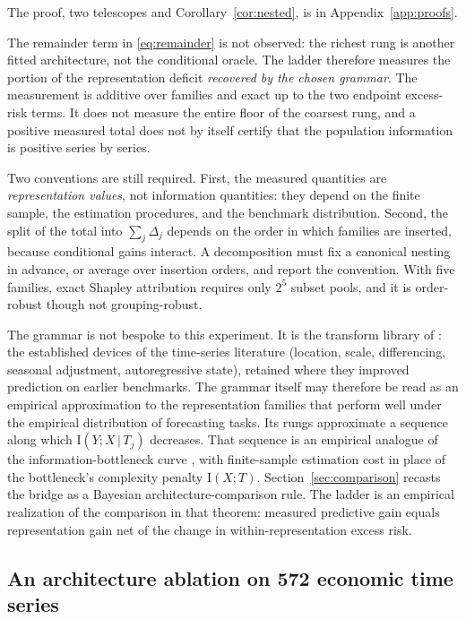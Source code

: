 \documentclass[11pt]{article}
\theoremstyle{remark}
\newcommand{\I}{\mathrm{I}}
\newcommand{\given}{\,|\,}
\begin{document}
The proof, two telescopes and Corollary~\ref{cor:nested}, is in Appendix~\ref{app:proofs}.

The remainder term in \eqref{eq:remainder} is not observed: the richest rung is another fitted
architecture, not the conditional oracle. The ladder therefore measures the portion of the
representation deficit \emph{recovered by the chosen grammar}. The measurement is additive
over families and exact up to the two endpoint excess-risk terms. It does not measure the entire floor of the
coarsest rung, and a positive measured total does not by itself certify that the population
information is positive series by series.

Two conventions are still required. First, the measured quantities are \emph{representation
values}, not information quantities: they depend on the finite sample, the estimation
procedures, and the benchmark distribution. Second, the split of the total into $\sum_j\Delta_j$ depends on the order in which families
are inserted, because conditional gains interact. A decomposition must fix a canonical
nesting in advance, or average over insertion orders, and report the convention. With five
families, exact Shapley attribution requires only $2^5$ subset pools, and it is order-robust
though not grouping-robust.

The grammar is not bespoke to this experiment. It is the transform library of
\citet{cotton_skaters}: the established devices of the time-series literature (location,
scale, differencing, seasonal adjustment, autoregressive state), retained where they improved
prediction on earlier benchmarks. The grammar itself may therefore be read as an empirical approximation to the representation families that perform well under
the empirical distribution of forecasting tasks. Its rungs approximate a sequence along which
$\I(Y;X\given T_j)$ decreases. That sequence is an empirical analogue of the
information-bottleneck curve \citep{tishby1999information}, with finite-sample estimation
cost in place of the bottleneck's complexity penalty $\I(X;T)$.
Section~\ref{sec:comparison} recasts the bridge as a Bayesian architecture-comparison rule.
The ladder is an empirical realization of the comparison in that theorem: measured predictive
gain equals representation gain net of the change in within-representation excess risk.

\subsection{An architecture ablation on 572 economic time series}\label{sec:ablation}
\end{document}
